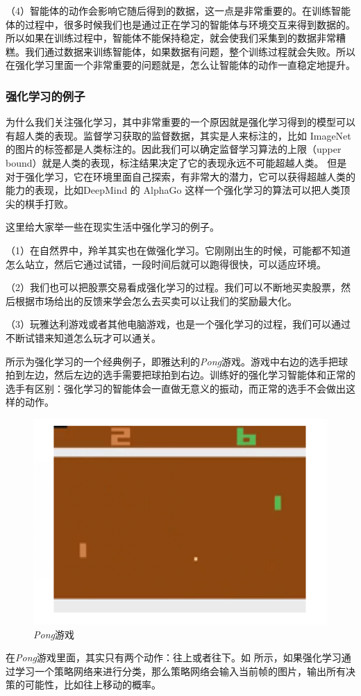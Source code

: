 （4）智能体的动作会影响它随后得到的数据，这一点是非常重要的。在训练智能体的过程中，很多时候我们也是通过正在学习的智能体与环境交互来得到数据的。所以如果在训练过程中，智能体不能保持稳定，就会使我们采集到的数据非常糟糕。我们通过数据来训练智能体，如果数据有问题，整个训练过程就会失败。所以在强化学习里面一个非常重要的问题就是，怎么让智能体的动作一直稳定地提升。

\subsubsection{强化学习的例子}
为什么我们关注强化学习，其中非常重要的一个原因就是强化学习得到的模型可以有超人类的表现。监督学习获取的监督数据，其实是人来标注的，比如 ImageNet 的图片的标签都是人类标注的。因此我们可以确定监督学习算法的上限（upper bound）就是人类的表现，标注结果决定了它的表现永远不可能超越人类。
但是对于强化学习，它在环境里面自己探索，有非常大的潜力，它可以获得超越人类的能力的表现，比如DeepMind 的 AlphaGo 这样一个强化学习的算法可以把人类顶尖的棋手打败。

这里给大家举一些在现实生活中强化学习的例子。

（1）在自然界中，羚羊其实也在做强化学习。它刚刚出生的时候，可能都不知道怎么站立，然后它通过试错，一段时间后就可以跑得很快，可以适应环境。

（2）我们也可以把股票交易看成强化学习的过程。我们可以不断地买卖股票，然后根据市场给出的反馈来学会怎么去买卖可以让我们的奖励最大化。

（3）玩雅达利游戏或者其他电脑游戏，也是一个强化学习的过程，我们可以通过不断试错来知道怎么玩才可以通关。

 所示为强化学习的一个经典例子，即雅达利的\textit{Pong}游戏。游戏中右边的选手把球拍到左边，然后左边的选手需要把球拍到右边。训练好的强化学习智能体和正常的选手有区别：强化学习的智能体会一直做无意义的振动，而正常的选手不会做出这样的动作。

\begin{figure}[htb]
    \centering
    \includegraphics[width=0.3\linewidth]{res/ch1/1.9}
    \caption{\textit{Pong}游戏}
    \label{fig:pong_game}
\end{figure}

在\textit{Pong}游戏里面，其实只有两个动作：往上或者往下。如 所示，如果强化学习通过学习一个策略网络来进行分类，那么策略网络会输入当前帧的图片，输出所有决策的可能性，比如往上移动的概率。

